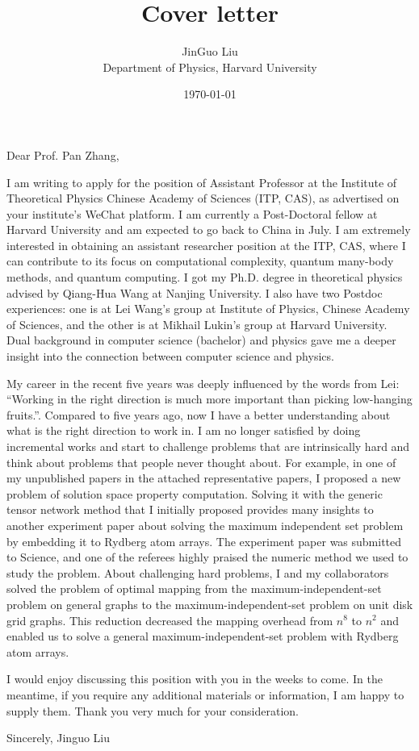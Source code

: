 \documentclass[a4paper]{letter}
\title{Cover letter}
\author{JinGuo Liu\\ Department of Physics, Harvard University}
\date{\today}
\begin{document}
\fontsize{10}{13}
\selectfont

Dear Prof. Pan Zhang,


I am writing to apply for the position of Assistant Professor at the Institute of Theoretical Physics Chinese Academy of Sciences (ITP, CAS), as advertised on your institute's WeChat platform.
I am currently a Post-Doctoral fellow at Harvard University and am expected to go back to China in July.
I am extremely interested in obtaining an assistant researcher position at the ITP, CAS, where I can contribute to its focus on computational complexity, quantum many-body methods, and quantum computing.
I got my Ph.D. degree in theoretical physics advised by Qiang-Hua Wang at Nanjing University. 
I also have two Postdoc experiences: one is at Lei Wang's group at Institute of Physics, Chinese Academy of Sciences, and the other is at Mikhail Lukin's group at Harvard University.
Dual background in computer science (bachelor) and physics gave me a deeper insight into the connection between computer science and physics.

My career in the recent five years was deeply influenced by the words from Lei: ``Working in the right direction is much more important than picking low-hanging fruits.''.
Compared to five years ago, now I have a better understanding about what is the right direction to work in. I am no longer satisfied by doing incremental works and start to challenge problems that are intrinsically hard and think about problems that people never thought about.
For example, in one of my unpublished papers in the attached representative papers, I proposed a new problem of solution space property computation.
Solving it with the generic tensor network method that I initially proposed provides many insights to another experiment paper about solving the maximum independent set problem by embedding it to Rydberg atom arrays.
The experiment paper was submitted to Science, and one of the referees highly praised the numeric method we used to study the problem.
About challenging hard problems, I and my collaborators solved the problem of optimal mapping from the maximum-independent-set problem on general graphs to the maximum-independent-set problem on unit disk grid graphs.
This reduction decreased the mapping overhead from $n^8$ to $n^2$ and enabled us to solve a general maximum-independent-set problem with Rydberg atom arrays.

I would enjoy discussing this position with you in the weeks to come. In the meantime, if you require any additional materials or information, I am happy to supply them. Thank you very much for your consideration.

Sincerely, Jinguo Liu
\end{document}
